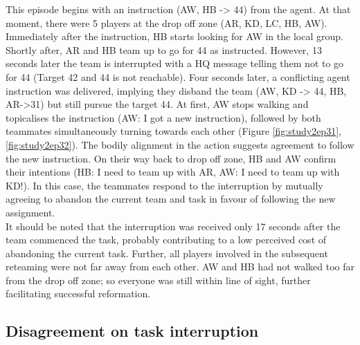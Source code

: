 This episode begins with an instruction (AW, HB -> 44) from the agent. At that moment, there were 5 players at the drop off zone (AR, KD, LC, HB, AW). Immediately after the instruction, HB starts looking for AW in the local group. Shortly after, AR and HB team up to go for 44 as instructed.  However, 13 seconds later the team is interrupted with a HQ message telling them not to go for 44 (Target 42 and 44 is not reachable). Four seconds later, a conflicting agent instruction was delivered, implying they disband the team (AW, KD -> 44, HB, AR->31) but still pursue the target 44. At first, AW stops walking and topicalises the instruction (AW: I got a new instruction), followed by both teammates simultaneously turning towards each other (Figure \ref{fig:study2ep31}, \ref{fig:study2ep32}). The bodily alignment in the action suggests agreement to follow the new instruction. On their way back to drop off zone, HB and AW confirm their intentions (HB: I need to team up with AR, AW: I need to team up with KD!). In this case, the teammates respond to the interruption by mutually agreeing to abandon the current team and task in favour of following the new assignment. \\

It should be noted that the interruption was received only 17 seconds after the team commenced the task, probably contributing to a low perceived cost of abandoning the current task. Further, all players involved in the subsequent reteaming were not far away from each other. AW and HB had not walked too far from the drop off zone; so everyone was still within line of sight, further facilitating successful reformation. \\

\subsection{Disagreement on task interruption}

